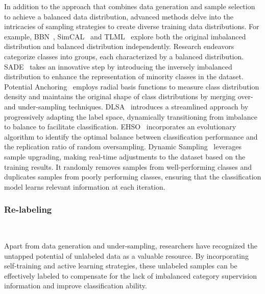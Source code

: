 In addition to the approach that combines data generation and sample selection to achieve a balanced data distribution, advanced methods delve into the intricacies of sampling strategies to create diverse training data distributions. For example, BBN~\cite{zhou2020bbn}, SimCAL~\cite{wang2020devil} and TLML~\cite{guo2021long} explore both the original imbalanced distribution and balanced distribution independently. 
Research endeavors~\cite{li2020overcoming, xiang2020learning, cai2021ace, cui2022reslt} categorize classes into groups, each characterized by a balanced distribution. SADE~\cite{zhang2022self} takes an innovative step by introducing the inversely imbalanced distribution to enhance the representation of minority classes in the dataset.
Potential Anchoring~\cite{koziarski2021potential} employs radial basis functions to measure class distribution density and maintains the original shape of class distributions by merging over- and under-sampling techniques. 
DLSA~\cite{xu2022constructing} introduces a streamlined approach by progressively adapting the label space, dynamically transitioning from imbalance to balance to facilitate classification. 
EHSO~\cite{zhu2020ehso} incorporates an evolutionary algorithm to identify the optimal balance between classification performance and the replication ratio of random oversampling. 
Dynamic Sampling~\cite{pouyanfar2018dynamic} leverages sample upgrading, making real-time adjustments to the dataset based on the training results. It randomly removes samples from well-performing classes and duplicates samples from poorly performing classes, ensuring that the classification model learns relevant information at each iteration. 




\subsubsection{Re-labeling}\
\label{s314}

Apart from data generation and under-sampling, researchers have recognized the untapped potential of unlabeled data as a valuable resource. By incorporating self-training and active learning strategies, these unlabeled samples can be effectively labeled to compensate for the lack of imbalanced category supervision information and improve classification ability. 

